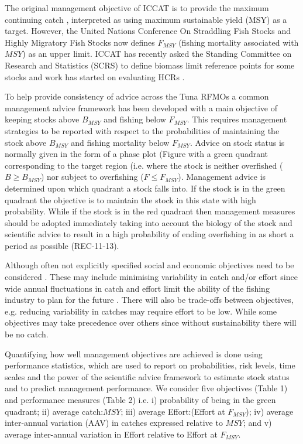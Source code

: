 \documentclass[%
nonumbib,      %
%
]{nrc1}                          %
\begin{document}
The original management objective of ICCAT is to provide the maximum continuing catch \citep{iccat2007basictext}, interpreted as using maximum sustainable yield (MSY) as a target. However, the United Nations Conference On Straddling Fish Stocks and Highly Migratory Fish Stocks \cite[UNFSA][]{un1995straddling} now defines $F_{MSY}$ (fishing mortality  associated  with $MSY$) as an upper limit. ICCAT has recently asked the Standing Committee on Research and Statistics (SCRS) to define  biomass limit reference points for some stocks and work has started on evaluating HCRs \citep{iccat2007swgsm}.

To help provide consistency of advice across the Tuna RFMOs a common management advice framework \cite[i.e. the Kobe Framework ][]{de2012precautionary} has been developed with a main objective of keeping stocks above $B_{MSY}$ and fishing below $F_{MSY}$. This requires management strategies to be reported with respect to the probabilities of maintaining the stock above $B_{MSY}$ and fishing mortality below $F_{MSY}$. Advice on stock status is normally given in the form of a phase plot (Figure %
with a green quadrant corresponding to the  target region (i.e. where the stock is neither overfished ($B \geq B_{MSY}$) nor subject to overfishing ($F \leq F_{MSY}$).
Management advice is determined upon which quadrant a stock falls into. If the stock is in the green quadrant the objective is to maintain the stock in this state with high probability. While if the stock is in the red quadrant then management measures should be adopted immediately taking into account the biology of the stock and scientific advice to result in a high probability of ending overfishing in as short a period as possible (REC-11-13).

Although often not explicitly specified social and economic objectives need to be considered \citep{iccat2007swgsm}. These may include minimising variability in catch and/or effort since wide annual fluctuations in catch and effort limit the ability of the fishing industry to plan for the future \citep{kell2005flat, kell2005round}. There will also be trade-offs between objectives, e.g. reducing variability in catches may require effort to be low. While some objectives may take precedence over others since without sustainability there will be no catch. 

Quantifying how well management objectives are achieved is done using performance statistics, which are used to report on probabilities, risk levels, time scales and the power of the scientific advice framework to estimate stock status and to predict management performance. We consider five objectives (Table 1) and performance measures (Table 2) i.e. i) probability of being in the green quadrant; ii) average catch:$MSY$; iii) average Effort:(Effort at $F_{MSY}$); iv) average inter-annual variation (AAV) in catches expressed relative to $MSY$; and v) average inter-annual variation in Effort relative to Effort at $F_{MSY}$.
\end{document}
